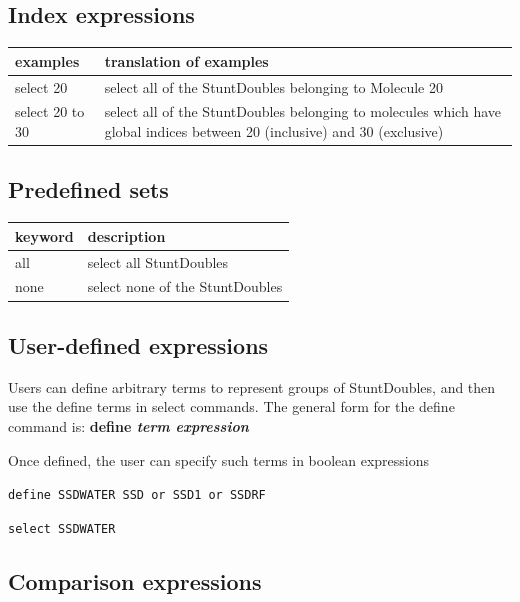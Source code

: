 \documentclass[]{book}
\begin{document}
\subsection{\label{section:index}Index expressions}

\begin{center}
\begin{tabular}{|lp{4in}|}
\hline
{\bf examples} & {\bf translation of examples} \\
\hline
select 20 & select all of the StuntDoubles belonging to Molecule 20 \\
select 20 to 30 & select all of the StuntDoubles belonging to
molecules which have global indices between 20 (inclusive) and 30
(exclusive) \\
\hline
\end{tabular}
\end{center}

\subsection{\label{section:predefined}Predefined sets}

\begin{center}
\begin{tabular}{|ll|}
\hline
{\bf keyword} & {\bf description} \\
\hline
all & select all StuntDoubles \\
none & select none of the StuntDoubles \\
\hline
\end{tabular}
\end{center}

\subsection{\label{section:userdefined}User-defined expressions}

Users can define arbitrary terms to represent groups of StuntDoubles,
and then use the define terms in select commands. The general form for
the define command is: {\bf define {\it term expression}}

Once defined, the user can specify such terms in boolean expressions

{\tt define SSDWATER SSD or SSD1 or SSDRF}

{\tt select SSDWATER}

\subsection{\label{section:comparison}Comparison expressions}
\end{document}
